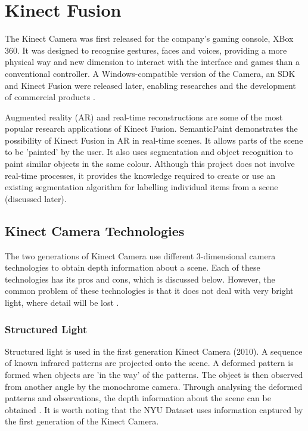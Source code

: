 \documentclass[lit_review.tex]{subfiles}
\begin{document}
\newpage

\section{Kinect Fusion}
The Kinect Camera was first released for the company's gaming console, XBox 360. It was designed to recognise gestures, faces and voices, providing a more physical way and new dimension to interact with the interface and games than a conventional controller. A Windows-compatible version of the Camera, an SDK and Kinect Fusion were released later, enabling researches and the development of commercial products \cite{kinect-doc}. 

Augmented reality (AR) and real-time reconstructions are some of the most popular research applications of Kinect Fusion. SemanticPaint \cite{semantic-paint} demonstrates the possibility of Kinect Fusion in AR in real-time scenes. It allows parts of the scene to be 'painted' by the user. It also uses segmentation and object recognition to paint similar objects in the same colour. Although this project does not involve real-time processes, it provides the knowledge required to create or use an existing segmentation algorithm for labelling individual items from a scene (discussed later). 

\subsection{Kinect Camera Technologies}
The two generations of Kinect Camera use different 3-dimensional camera technologies to obtain depth information about a scene. Each of these technologies has its pros and cons, which is discussed below. However, the common problem of these technologies is that it does not deal with very bright light, where detail will be lost \cite{chi-book}. 

\subsubsection{Structured Light}
Structured light is used in the first generation Kinect Camera (2010). A sequence of known infrared patterns are projected onto the scene. A deformed pattern is formed when objects are 'in the way' of the patterns. The object is then observed from another angle by the monochrome camera. Through analysing the deformed patterns and observations, the depth information about the scene can be obtained \cite{chi-book}\cite{kinect-cam-tech}. It is worth noting that the NYU Dataset \cite{nyu-dataset} uses information captured by the first generation of the Kinect Camera.
\end{document}
